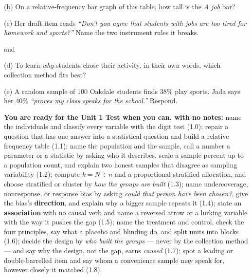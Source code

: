 \documentclass[10pt]{article}
\begin{document}
\begin{enumerate}[leftmargin=2.2em, itemsep=9pt, topsep=2pt]
\vspace{4pt}
(b) On a relative-frequency bar graph of this table, how tall is the \emph{A job} bar?

\vspace{3pt}
(c) Her draft item reads \emph{``Don't you agree that students with jobs are too tired for
homework and sports?''} Name the two instrument rules it breaks.

\vspace{2pt}
 \quad and \quad {}

\vspace{3pt}
(d) To learn \emph{why} students chose their activity, in their own words, which collection
method fits best? 

\vspace{3pt}
(e) A random sample of $100$ Oakdale students finds $38\%$ play sports. Jada says her $40\%$
\emph{``proves my class speaks for the school.''} Respond.

\par{}
\par{}

\end{enumerate}
\normalsize

\vspace{6pt}
\boxguard[16]
\begin{remindbox}
\small
\textbf{You are ready for the Unit 1 Test when you can, with no notes:}
name the individuals and classify every variable with the digit test (1.0);
repair a question that has one answer into a statistical question and build a relative
frequency table (1.1);
name the population and the sample, call a number a parameter or a statistic by asking who it
describes, scale a sample percent up to a population count, and explain two honest samples
that disagree as sampling variability (1.2);
compute $k = N \div n$ and a proportional stratified allocation, and choose stratified or
cluster by \emph{how the groups are built} (1.3);
name undercoverage, nonresponse, or response bias by asking \emph{could that person have been
chosen?}, give the bias's \textbf{direction}, and explain why a bigger sample repeats it (1.4);
state an \textbf{association} with no causal verb and name a reversed arrow or a lurking
variable with the way it pushes the gap (1.5);
name the treatment and control, check the four principles, say what a placebo and blinding do,
and split units into blocks (1.6);
decide the design by \emph{who built the groups} --- never by the collection method --- and say
why the design, not the gap, earns \emph{caused} (1.7);
spot a leading or double-barrelled item and say whom a convenience sample may speak for, however
closely it matched (1.8).
\end{remindbox}
\end{document}
